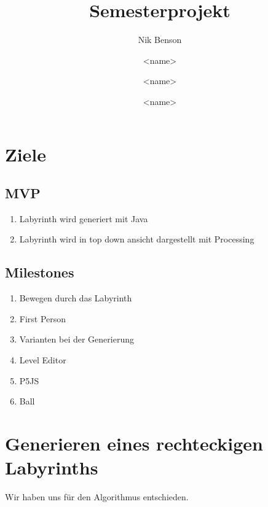 \documentclass[12pt]{article}
\title{Semesterprojekt}
\author[1]{Nik Benson}
\affil[1]{\href{mailto:nik.benson@studmail.w-hs.de}{nik.benson@studmail.w-hs.de}}
\author[2]{<name>}
\affil[2]{\href{mailto:<email>}{<email>}}
\author[3]{<name>}
\affil[3]{\href{mailto:<email>}{<email>}}
\author[4]{<name>}
\affil[4]{\href{mailto:<email>}{<email>}}
\begin{document}
    

    \tableofcontents
    \newpage
    \listoffigures
    \lstlistoflistings
    \newpage


    \section{Ziele}

        \subsection{MVP}
            \begin{enumerate}
                \item Labyrinth wird generiert mit Java
                \item Labyrinth wird in top down ansicht dargestellt mit Processing
            \end{enumerate}

        \subsection{Milestones}
            \begin{enumerate}
                \item Bewegen durch das Labyrinth
                \item First Person
                \item Varianten bei der Generierung
                \item Level Editor
                \item P5JS
                \item Ball
            \end{enumerate}

    \section{Generieren eines rechteckigen Labyrinths}\label{sec:generieren-eines-rechteckigen-labyrinths}
        Wir haben uns für den  Algorithmus entschieden.
\end{document}

